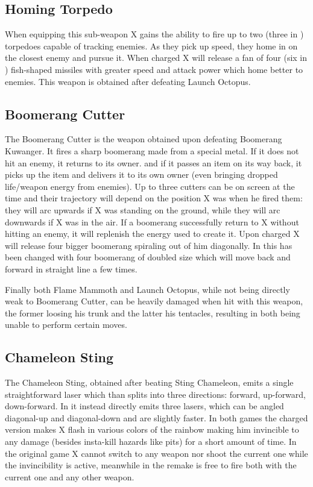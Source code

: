 \subsection{Homing Torpedo}\label{Homing_torpedo}
When equipping this sub-weapon X gains the ability to fire up to two (three in \mhx)\cite{wiki:Homing_torpedo} torpedoes capable of tracking enemies. As they pick up speed, they home in on the closest enemy and pursue it. When charged X will release a fan of four (six in \mhx) fish-shaped missiles with greater speed and attack power which home better to enemies. This weapon is obtained after defeating Launch Octopus.
\subsection{Boomerang Cutter}\label{Boomerang_cutter}
The Boomerang Cutter is the weapon obtained upon defeating Boomerang Kuwanger. It fires a sharp boomerang made from a special metal. If it does not hit an enemy, it returns to its owner. and if it passes an item on its way back, it picks up the	item and delivers it to its own owner (even bringing dropped life/weapon energy from enemies). Up to three cutters can be on screen at the time\cite{wiki:Boomerang_cutter} and their trajectory will depend on the position X was when he fired them: they will arc upwards if X was standing on the ground, while they will arc downwards if X was in the air. If a boomerang successfully return to X without hitting an enemy, it will replenish the energy used to create it. Upon charged X will release four bigger boomerang spiraling out of him diagonally. In \mhx this has been changed with four boomerang of doubled size which will move back and forward in straight line a few times. 

Finally both Flame Mammoth and Launch Octopus, while not being directly weak to Boomerang Cutter, can be heavily damaged when hit with this weapon, the former loosing his trunk and the latter his tentacles, resulting in both being unable to perform certain moves.
\subsection{Chameleon Sting}\label{Chameleon_sting}
The Chameleon Sting, obtained after beating Sting Chameleon, emits a single straightforward laser which than splits into three directions: forward, up-forward, down-forward. In \mhx it instead directly emits three lasers, which can be angled diagonal-up and diagonal-down and are slightly faster. In both games the charged version makes X flash in various colors of the rainbow making him invincible to any damage (besides insta-kill hazards like pits) for a short amount of time. In the original game X cannot switch to any weapon nor shoot the current one while the invincibility is active, meanwhile in the remake is free to fire both with the current one and any other weapon\cite{wiki:Chameleon_sting}.
